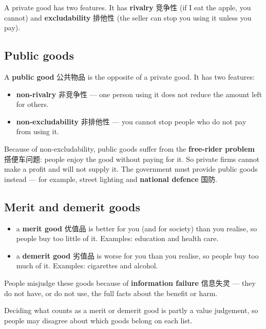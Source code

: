 \documentclass[11pt]{article}
\begin{document}
A private good has two features. It has \textbf{rivalry} 竞争性 (if I eat the apple, you cannot) and \textbf{excludability} 排他性 (the seller can stop you using it unless you pay).

\subsection*{Public goods}

A \textbf{public good} 公共物品 is the opposite of a private good. It has two features:

\begin{itemize}
\item \textbf{non-rivalry} 非竞争性 — one person using it does not reduce the amount left for others.

\item \textbf{non-excludability} 非排他性 — you cannot stop people who do not pay from using it.

\end{itemize}

Because of non-excludability, public goods suffer from the \textbf{free-rider problem} 搭便车问题: people enjoy the good without paying for it. So private firms cannot make a profit and will not supply it. The government must provide public goods instead — for example, street lighting and \textbf{national defence} 国防.

\subsection*{Merit and demerit goods}

\begin{itemize}
\item a \textbf{merit good} 优值品 is better for you (and for society) than you realise, so people buy too little of it. Examples: education and health care.

\item a \textbf{demerit good} 劣值品 is worse for you than you realise, so people buy too much of it. Examples: cigarettes and alcohol.

\end{itemize}

People misjudge these goods because of \textbf{information failure} 信息失灵 — they do not have, or do not use, the full facts about the benefit or harm.

Deciding what counts as a merit or demerit good is partly a value judgement, so people may disagree about which goods belong on each list.
\end{document}
